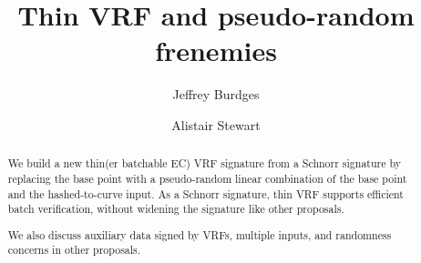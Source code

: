 \documentclass[runningheads,evcountsame,a4paper,11pt,orivec]{llncs}
\title{Thin VRF and pseudo-random frenemies}
\author{Jeffrey Burdges \and Alistair Stewart}
\date{}
\begin{document}
	
\maketitle

\begin{abstract}
We build a new thin(er batchable EC) VRF signature from a Schnorr
signature by replacing the base point with a pseudo-random linear
combination of the base point and the hashed-to-curve input.
%
As a Schnorr signature, thin VRF supports efficient batch verification,
without widening the signature like other proposals.

We also discuss auxiliary data signed by VRFs, multiple inputs,
and randomness concerns in other proposals.
\end{abstract}



% 








\end{document}

